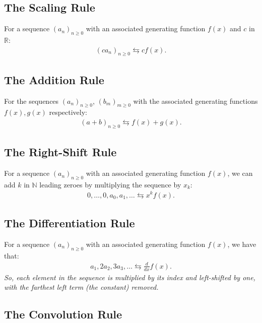 \documentclass[a4paper, 12pt, twoside]{article}
\begin{document}
\subsection{The Scaling Rule}

For a sequence $(a_n)_{n \geq 0}$ with an
associated generating function $f(x)$ and $c$ in $\mathbb{R}$: \begin{gather*}
  (ca_n)_{n \geq 0} \leftrightarrows cf(x).
\end{gather*}

\subsection{The Addition Rule}

For the sequences $(a_n)_{n \geq 0}$, $(b_m)_{m \geq 0}$ 
with the associated generating functions $f(x), g(x)$ respectively: \begin{gather*}
  (a + b)_{n \geq 0} \leftrightarrows f(x) + g(x).
\end{gather*}

\subsection{The Right-Shift Rule}

For a sequence $(a_n)_{n \geq 0}$ with an associated generating 
function $f(x)$, we can add $k$ in $\mathbb{N}$ leading zeroes by
multiplying the sequence by $x_k$: \begin{gather*}
  0, \ldots, 0, a_0, a_1, \ldots \leftrightarrows x^kf(x).
\end{gather*}

\subsection{The Differentiation Rule}

For a sequence $(a_n)_{n \geq 0}$ with an associated generating 
function $f(x)$, we have that: \begin{gather*}
  a_1, 2a_2, 3a_3, \ldots \leftrightarrows \frac{d}{dx}f(x).
\end{gather*} \textit{So, each element in the sequence
is multiplied by its index and left-shifted by one, with
the farthest left term (the constant) removed.}

\subsection{The Convolution Rule}
\end{document}
